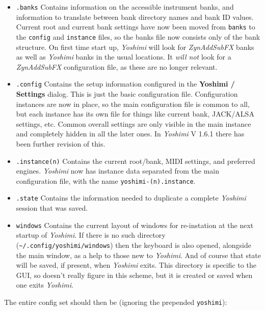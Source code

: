   \begin{itemize}
      \item \texttt{.banks}
         Contains information on the accessible instrument banks, and
         information to translate between bank directory names and bank ID
         values.
         Current root and current bank settings have now been moved from
         \texttt{banks} to the \texttt{config} and \texttt{instance}
         files, so the banks file now consists only of the bank structure.
         On first time start up, \textsl{Yoshimi} will look for
         \textsl{ZynAddSubFX} banks as well as \textsl{Yoshimi} banks in the
         usual locations. It \textsl{will not} look for a \textsl{ZynAddSubFX}
         configuration file, as these are no longer relevant.
      \item \texttt{.config}
         Contains the setup information configured in the
         \textbf{Yoshimi / Settings} dialog.
         This is just the basic configuration file.
         Configuration instances are now in place, so the main configuration
         file is common to all, but each instance has its own file for things
         like current bank, JACK/ALSA settings, etc.
         Common overall settings are only visible in the main instance and
         completely hidden in all the later ones.
         In \textsl{Yoshimi} V 1.6.1 there has been further revision of this.
      \item \texttt{.instance(n)}
         Contains the current root/bank, MIDI settings, and preferred engines.
         \textsl{Yoshimi} now has instance data separated from the main
         configuration file, with the name \texttt{yoshimi-(n).instance}.
      \item \texttt{.state}
         Contains the information needed to duplicate a complete \textsl{Yoshimi}
         session that was saved.
      \item \texttt{windows}
         Contains the current layout of windows for re-instation at the next
         startup of \textsl{Yoshimi}.
         If there is no such directory
         (\texttt{\textasciitilde/.config/yoshimi/windows}) then the
         keyboard is also opened, alongside the main window, as a help to those
         new to \textsl{Yoshimi}.
         And of course that state will be saved, if present, when
         \textsl{Yoshimi} exits.
         This directory is specific to the GUI, so doesn't really figure in
         this scheme, but it is created or saved when one exits
         \textsl{Yoshimi}.
   \end{itemize}
   The entire config set should then be (ignoring the prepended
   \texttt{yoshimi}):

